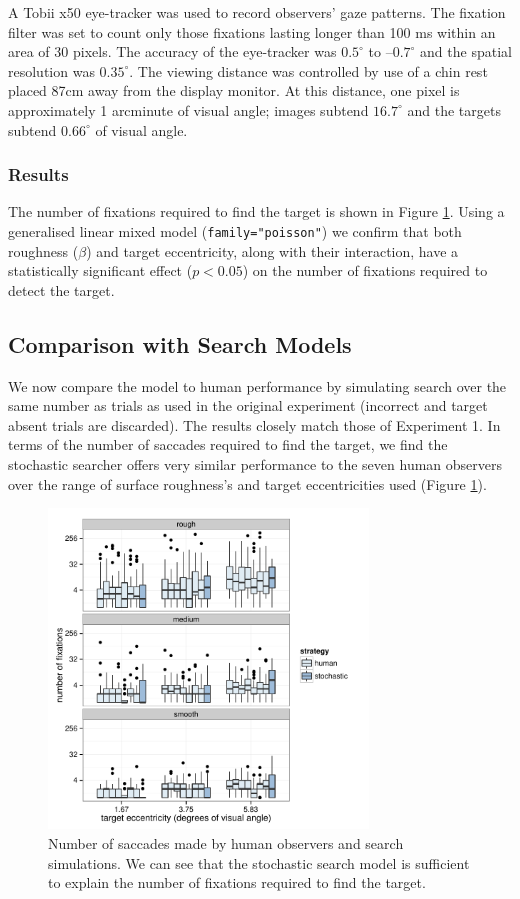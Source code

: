 \documentclass[man]{apa6}
\begin{document}
A Tobii x50 eye-tracker was used to record observers' gaze patterns. The fixation filter was set to count only those fixations lasting longer than 100 ms within an area of 30 pixels. The accuracy of the eye-tracker was $0.5^{\circ}$ to $–0.7^{\circ}$ and the spatial resolution was $0.35^{\circ}$. The viewing distance was controlled by use of a chin rest placed 87cm away from the display monitor. At this distance, one pixel is approximately 1 arcminute of visual angle; images subtend $16.7^{\circ}$ and the targets subtend $0.66^{\circ}$ of visual angle. 

\subsubsection{Results}
\label{sec:SearchPerf}
The number of fixations required to find the target is shown in Figure \ref{fig:numFixHumanModelClarke2009}. Using a generalised linear mixed model  (\texttt{family="poisson"}) we confirm that both roughness ($\beta$) and target eccentricity, along with their interaction, have a statistically significant effect ($p<0.05$) on the number of fixations required to detect the target. 

\subsection{Comparison with Search Models}

We now compare the model to human performance by simulating search over the same number as trials as used in the original experiment (incorrect and target absent trials are discarded). The results closely match those of Experiment 1. In terms of the number of saccades required to find the target, we find the stochastic searcher offers very similar performance to the seven human observers over the range of surface roughness's and target eccentricities used (Figure  \ref{fig:numFixHumanModelClarke2009}).

\begin{figure}
	\centering
	\includegraphics[width=8.5cm]{fig/numFixHumanModelclarke2009.pdf}
	\caption{Number of saccades made by human observers and search simulations. We can see that the stochastic search model is sufficient to explain the number of fixations required to find the target.} 
	\label{fig:numFixHumanModelClarke2009}
\end{figure}
\end{document}

